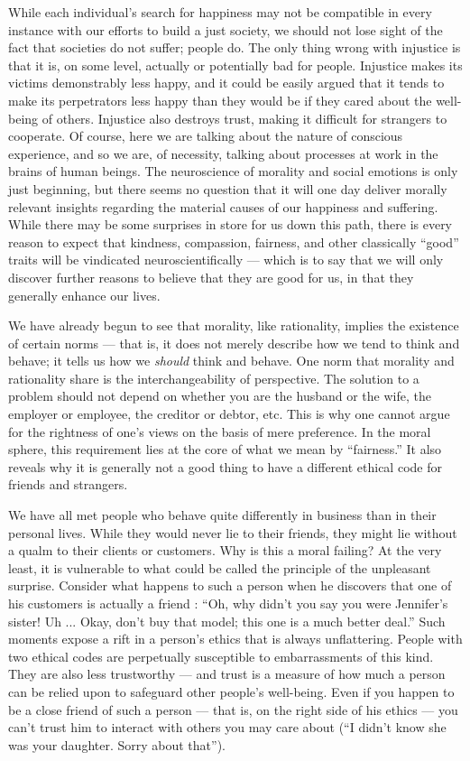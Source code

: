 \documentclass[a4paper,14pt]{extarticle}
\begin{document}
While each individual's search for happiness may not be compatible in every instance with our efforts to build a just society, we should not lose sight of the fact that societies do not suffer;
people do.
The only thing wrong with injustice is that it is, on some level, actually or potentially bad for people.
Injustice makes its victims demonstrably less happy, and it could be easily argued that it tends to make its perpetrators less happy than they would be if they cared about the well-being of others.
Injustice also destroys trust, making it difficult for strangers to cooperate.
Of course, here we are talking about the nature of conscious experience, and so we are, of necessity, talking about processes at work in the brains of human beings.
The neuroscience of morality and social emotions is only just beginning, but there seems no question that it will one day deliver morally relevant insights regarding the material causes of our happiness and suffering.
While there may be some surprises in store for us down this path, there is every reason to expect that kindness, compassion, fairness, and other classically ``good'' traits will be vindicated neuroscientifically --- which is to say that we will only discover further reasons to believe that they are good for us, in that they generally enhance our lives.

We have already begun to see that morality, like rationality, implies the existence of certain norms --- that is, it does not merely describe how we tend to think and behave;
it tells us how we \textit{should} think and behave.
One norm that morality and rationality share is the interchangeability of perspective.
The solution to a problem should not depend on whether you are the husband or the wife, the employer or employee, the creditor or debtor, etc.
This is why one cannot argue for the rightness of one's views on the basis of mere preference.
In the moral sphere, this requirement lies at the core of what we mean by ``fairness.''
It also reveals why it is generally not a good thing to have a different ethical code for friends and strangers.

We have all met people who behave quite differently in business than in their personal lives.
While they would never lie to their friends, they might lie without a qualm to their clients or customers.
Why is this a moral failing?
At the very least, it is vulnerable to what could be called the principle of the unpleasant surprise.
Consider what happens to such a person when he discovers that one of his customers is actually a friend :
``Oh, why didn't you say you were Jennifer's sister!
Uh ... Okay, don't buy that model;
this one is a much better deal.''
Such moments expose a rift in a person's ethics that is always unflattering.
People with two ethical codes are perpetually susceptible to embarrassments of this kind.
They are also less trustworthy --- and trust is a measure of how much a person can be relied upon to safeguard other people's well-being.
Even if you happen to be a close friend of such a person --- that is, on the right side of his ethics --- you can't trust him to interact with others you may care about
(``I didn't know she was your daughter.
Sorry about that'').
\end{document}
